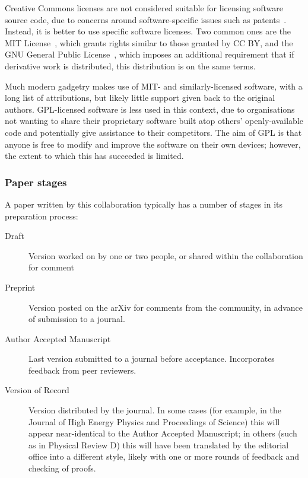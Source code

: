 \documentclass{article}
\begin{document}
Creative Commons licenses are not considered
suitable for licensing software source code,
due to concerns around software-specific issues such as patents~\cite{ccfaq}.
Instead,
it is better to use specific software licenses.
Two common ones are the MIT License~\cite{mit},
which grants rights similar to those granted by CC BY,
and the GNU General Public License~\cite{gpl},
which imposes an additional requirement that
if derivative work is distributed,
this distribution is on the same terms.

Much modern gadgetry makes use of MIT- and similarly-licensed software,
with a long list of attributions,
but likely little support given back to the original authors.
GPL-licensed software is less used in this context,
due to organisations not wanting to share
their proprietary software built atop others' openly-available code
and potentially give assistance to their competitors.
The aim of GPL is that
anyone is free to modify and improve the software on their own devices;
however,
the extent to which this has succeeded is limited.

\subsubsection{Paper stages}

A paper written by this collaboration
typically has a number of stages in its preparation process:

\begin{description}
  \item[Draft]
        Version worked on by one or two people,
        or shared within the collaboration for comment
  \item[Preprint]
        Version posted on the arXiv for comments from the community,
        in advance of submission to a journal.
  \item[Author Accepted Manuscript]
        Last version submitted to a journal before acceptance.
        Incorporates feedback from peer reviewers.
  \item[Version of Record]
        Version distributed by the journal.
        In some cases
        (for example,
        in the Journal of High Energy Physics
        and Proceedings of Science)
        this will appear near-identical to the Author Accepted Manuscript;
        in others
        (such as in Physical Review D)
        this will have been
        translated by the editorial office into a different style,
        likely with one or more rounds of feedback
        and checking of proofs.
\end{description}
\end{document}
